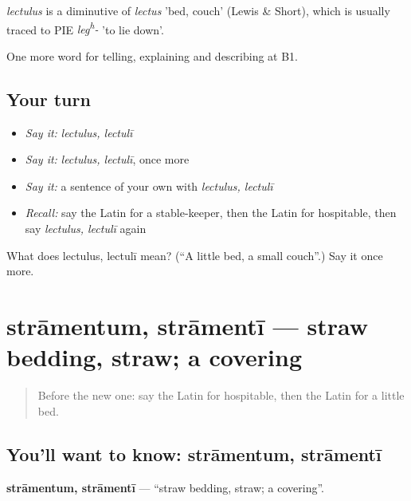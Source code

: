 \begin{cousinweb}
\emph{lectulus} is a diminutive of \emph{lectus} 'bed, couch' (Lewis \& Short), which is usually traced to PIE \emph{leg\textsuperscript{h}-} 'to lie down'.
\end{cousinweb}

\begin{grammarlens}[title={What you've built}]
One more word for telling, explaining and describing at B1.
\end{grammarlens}

\subsection*{Your turn}
\begin{itemize}
\raggedright
  \item \emph{Say it:} \emph{lectulus, lectulī}
  \item \emph{Say it:} \emph{lectulus, lectulī}, once more
  \item \emph{Say it:} a sentence of your own with \emph{lectulus, lectulī}
  \item \emph{Recall:} say the Latin for a stable-keeper, then the Latin for hospitable, then say \emph{lectulus, lectulī} again
\end{itemize}

\begin{tcolorbox}[breakable,colback=teal!4,colframe=teal!35!black,title={Before you move on}]
What does lectulus, lectulī mean? (\textquotedblleft{}A little bed, a small couch\textquotedblright{}.) Say it once more.
\end{tcolorbox}
\section[strāmentum, strāmentī]{strāmentum, strāmentī — straw bedding, straw; a covering}

\label{lesson:LA-C446-stramentum}



\begin{quote}
Before the new one: say the Latin for hospitable, then the Latin for a little bed.
\end{quote}

\subsection*{You'll want to know: strāmentum, strāmentī}
\textbf{strāmentum, strāmentī} — \textquotedblleft{}straw bedding, straw; a covering\textquotedblright{}.

